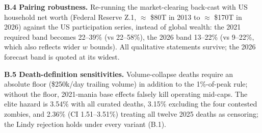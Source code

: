 \documentclass[11pt]{article}
\begin{document}
\textbf{B.4 Pairing robustness.} Re-running the market-clearing back-cast with US household net worth (Federal Reserve Z.1, $\approx$ \$80T in 2013 to $\approx$ \$170T in 2026) against the US participation series, instead of global wealth: the 2021 required band becomes 22--39\% (vs 22--58\%), the 2026 band 13--22\% (vs 9--22\%, which also reflects wider $w$ bounds). All qualitative statements survive; the 2026 forecast band is quoted at its widest.

\textbf{B.5 Death-definition sensitivities.} Volume-collapse deaths require an absolute floor (\$250k/day trailing volume) in addition to the 1\%-of-peak rule; without the floor, 2021-mania base effects falsely kill operating mid-caps. The elite hazard is 3.54\% with all curated deaths, 3.15\% excluding the four contested zombies, and 2.36\% (CI 1.51--3.51\%) treating all twelve 2025 deaths as censoring; the Lindy rejection holds under every variant (B.1).
\end{document}
